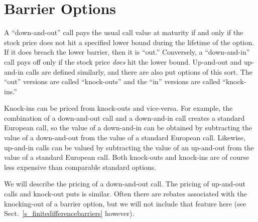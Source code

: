 
\section{Barrier Options}\label{s_barriers}

     A ``down-and-out'' call pays the usual call value at maturity if and only if the stock price does not hit a specified lower bound during the lifetime of the option.  If it does breach the lower barrier, then it is ``out.''  Conversely, a ``down-and-in'' call pays off only if the stock price \emph{does} hit the lower bound.  Up-and-out and up-and-in calls are defined similarly, and there are also put options of this sort.  The ``out'' versions are called ``knock-outs'' and the ``in'' versions are called ``knock-ins.''  

Knock-ins can be priced from knock-outs and vice-versa.  For example, the combination of a down-and-out call and a down-and-in call creates a standard European call, so the value of a down-and-in can be obtained by subtracting the value of a down-and-out from the value of a standard European call.  Likewise, up-and-in calls can be valued by subtracting the value of an up-and-out from the value of a standard European call.  Both knock-outs and knock-ins are of course less expensive than comparable standard options.


We will describe the pricing of a down-and-out call.  The pricing of up-and-out calls and knock-out puts is similar.  Often there are rebates associated with the knocking-out of a barrier option, but we will not include that feature here (see Sect.~\ref{s_finitedifferencebarriers} however).  

